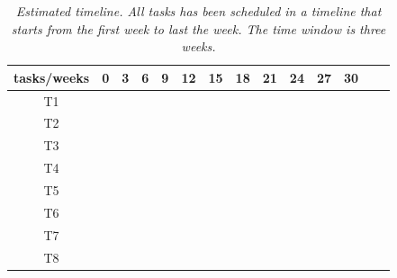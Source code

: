 \begin{table}[H]
  \centering
  \label{tab:340W}
  \begin{tabular}{| c | c | c | c |c | c | c |c | c | c |c | c | c |c | }
    \hline
    tasks/weeks & 0 & 3 & 6 & 9 & 12 & 15 & 18 & 21 & 24 & 27 & 30 \\
    \hline
    T1  & \cellcolor{red!50} &   &   &   &   &   &   &   &   &   &     \\
    \hline
    T2  &   & \cellcolor{lime!50}  &  &  &   &   &   &    &  &  &   \\
    \hline
    T3  &  &  & \cellcolor{blue!40} &  &   &   &   &   &  &  & \\
    \hline
    T4  &  &  &  & \cellcolor{teal!50} & \cellcolor{teal!50} &  &  &   &   &   &   \\
    \hline
    T5  &  &  &  &  & \cellcolor{amber!30} & \cellcolor{amber!30} & \cellcolor{amber!30}  & \cellcolor{amber!30} & \cellcolor{amber!30}  &  & \\
    \hline
    T6  &  &  &  &  & \cellcolor{black!70} & \cellcolor{black!70} & \cellcolor{black!70}  & \cellcolor{black!70} & \cellcolor{black!70}  &  \cellcolor{black!70} & \\
    \hline
    T7  &   &  &  &  &  &  &  &   &    & \cellcolor{gray!50} & \\
    \hline
    T8  &   &  &  &  &  & \cellcolor{orange!50}  &  &   &   & \cellcolor{orange!50} & \cellcolor{orange!50} \\
    \hline
  \end{tabular}
  \caption[Estimated timeline]
  {\textit{Estimated timeline.
  All tasks has been scheduled in a timeline that starts from the first week to last the week.
  The time window is three weeks.
  }}
\end{table}
